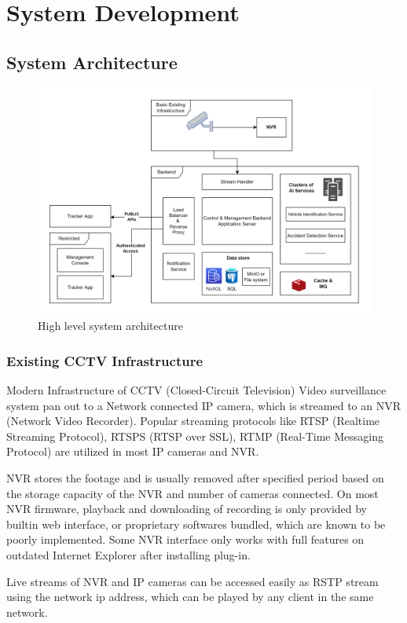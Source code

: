 \chapter{System Development}
\lipsum[1]


\section{System Architecture}

\begin{figure}
	\centering
	\includegraphics[width=0.8\linewidth]{Images/architecture_high_level}
	\caption{High level system architecture}
	\label{fig:architecturehighlevel}
\end{figure}


\subsection{Existing CCTV Infrastructure}
Modern Infrastructure of CCTV (Closed-Circuit Television) Video surveillance system pan out to a Network connected IP camera, which is streamed to an NVR (Network Video Recorder). Popular streaming protocols like RTSP (Realtime Streaming Protocol), RTSPS (RTSP over SSL), RTMP (Real-Time Messaging Protocol) are utilized in most IP cameras and NVR. 

NVR stores the footage and is usually removed after specified period based on the storage capacity of the NVR and number of cameras connected. On most NVR firmware, playback and downloading of recording is only provided by builtin web interface, or proprietary softwares bundled, which are known to be poorly implemented. Some NVR interface only works with full features on outdated Internet Explorer after installing plug-in.

Live streams of NVR and IP cameras can be accessed easily as RSTP stream using the network ip address, which can be played by any client in the same network.

